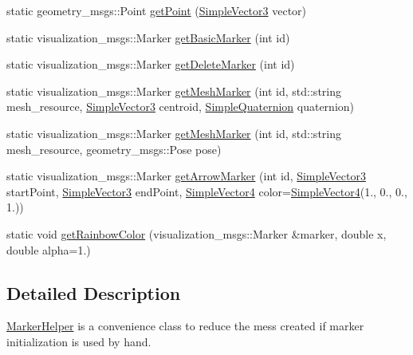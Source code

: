 \begin{DoxyCompactItemize}
\item 
static geometry\-\_\-msgs\-::\-Point \hyperlink{classnext__best__view_1_1MarkerHelper_ab7c0ca576102d089459f566ebeacced8}{get\-Point} (\hyperlink{namespacenext__best__view_a59fc75b908e198bc02a9b19ba88edf12}{\-Simple\-Vector3} vector)
\item 
static visualization\-\_\-msgs\-::\-Marker \hyperlink{classnext__best__view_1_1MarkerHelper_abdd817e6d021d2f87fb94f2b5a36059e}{get\-Basic\-Marker} (int id)
\item 
static visualization\-\_\-msgs\-::\-Marker \hyperlink{classnext__best__view_1_1MarkerHelper_abd56db4892bbe470b5fae761e006860a}{get\-Delete\-Marker} (int id)
\item 
static visualization\-\_\-msgs\-::\-Marker \hyperlink{classnext__best__view_1_1MarkerHelper_a415e5ed5041fa22699c5c1243bb4ff70}{get\-Mesh\-Marker} (int id, std\-::string mesh\-\_\-resource, \hyperlink{namespacenext__best__view_a59fc75b908e198bc02a9b19ba88edf12}{\-Simple\-Vector3} centroid, \hyperlink{namespacenext__best__view_a165f1f159539ff8e583fb7fe3620390c}{\-Simple\-Quaternion} quaternion)
\item 
static visualization\-\_\-msgs\-::\-Marker \hyperlink{classnext__best__view_1_1MarkerHelper_a8e0a028e836fb124e6f2f1e58a08bbc5}{get\-Mesh\-Marker} (int id, std\-::string mesh\-\_\-resource, geometry\-\_\-msgs\-::\-Pose pose)
\item 
static visualization\-\_\-msgs\-::\-Marker \hyperlink{classnext__best__view_1_1MarkerHelper_a346813e14430a95ba39daea0f000cf10}{get\-Arrow\-Marker} (int id, \hyperlink{namespacenext__best__view_a59fc75b908e198bc02a9b19ba88edf12}{\-Simple\-Vector3} start\-Point, \hyperlink{namespacenext__best__view_a59fc75b908e198bc02a9b19ba88edf12}{\-Simple\-Vector3} end\-Point, \hyperlink{namespacenext__best__view_a209f68566d35160dd94fca758a33df33}{\-Simple\-Vector4} color=\hyperlink{namespacenext__best__view_a209f68566d35160dd94fca758a33df33}{\-Simple\-Vector4}(1., 0., 0., 1.))
\item 
static void \hyperlink{classnext__best__view_1_1MarkerHelper_a097aa0af180674a001da9a29bafd9b8f}{get\-Rainbow\-Color} (visualization\-\_\-msgs\-::\-Marker \&marker, double x, double alpha=1.)
\end{DoxyCompactItemize}


\subsection{\-Detailed \-Description}
\hyperlink{classnext__best__view_1_1MarkerHelper}{\-Marker\-Helper} is a convenience class to reduce the mess created if marker initialization is used by hand. 

